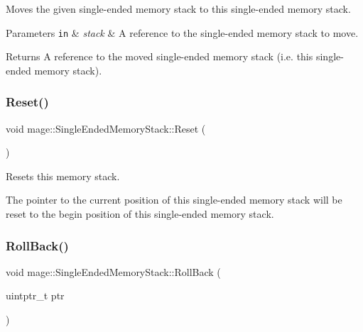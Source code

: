 Moves the given single-\/ended memory stack to this single-\/ended memory stack.


\begin{DoxyParams}[1]{Parameters}
\mbox{\tt in}  & {\em stack} & A reference to the single-\/ended memory stack to move. \\
\hline
\end{DoxyParams}
\begin{DoxyReturn}{Returns}
A reference to the moved single-\/ended memory stack (i.\+e. this single-\/ended memory stack). 
\end{DoxyReturn}
\mbox{\label{classmage_1_1_single_ended_memory_stack_abd43ab7bd76655265123b934ea2bc7a7}} 
\subsubsection{\texorpdfstring{Reset()}{Reset()}}
{\footnotesize\ttfamily void mage\+::\+Single\+Ended\+Memory\+Stack\+::\+Reset (\begin{DoxyParamCaption}{ }\end{DoxyParamCaption})\hspace{0.3cm}{\ttfamily [noexcept]}}

Resets this memory stack.

The pointer to the current position of this single-\/ended memory stack will be reset to the begin position of this single-\/ended memory stack. \mbox{\label{classmage_1_1_single_ended_memory_stack_afa1fcaa95a61995234759f9c57723202}} 
\subsubsection{\texorpdfstring{Roll\+Back()}{RollBack()}}
{\footnotesize\ttfamily void mage\+::\+Single\+Ended\+Memory\+Stack\+::\+Roll\+Back (\begin{DoxyParamCaption}\item[{uintptr\+\_\+t}]{ptr }\end{DoxyParamCaption})\hspace{0.3cm}{\ttfamily [noexcept]}}

